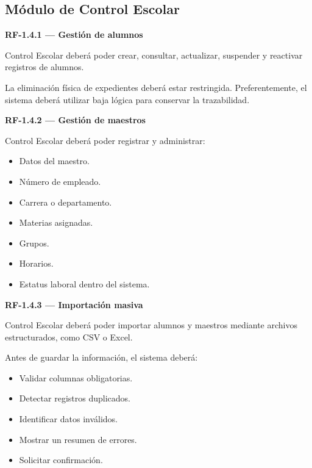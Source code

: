 \documentclass[12pt,a4paper]{article}
\newcommand{\RF}[1]{\textbf{\color{primary}RF-#1}}
\newenvironment{requisito}[1]
{
\begin{center}
\begin{minipage}{0.96\textwidth}
\colorbox{requirement}{
\begin{minipage}{0.94\textwidth}
\textbf{#1}
\end{minipage}
}
\vspace{2mm}
}
{
\end{minipage}
\end{center}
}
\begin{document}
\subsection{Módulo de Control Escolar}

\begin{requisito}{\RF{1.4.1} --- Gestión de alumnos}
Control Escolar deberá poder crear, consultar, actualizar, suspender y reactivar
registros de alumnos.

La eliminación física de expedientes deberá estar restringida. Preferentemente,
el sistema deberá utilizar baja lógica para conservar la trazabilidad.
\end{requisito}

\begin{requisito}{\RF{1.4.2} --- Gestión de maestros}
Control Escolar deberá poder registrar y administrar:

\begin{itemize}[leftmargin=*]
\item Datos del maestro.
\item Número de empleado.
\item Carrera o departamento.
\item Materias asignadas.
\item Grupos.
\item Horarios.
\item Estatus laboral dentro del sistema.
\end{itemize}
\end{requisito}

\begin{requisito}{\RF{1.4.3} --- Importación masiva}
Control Escolar deberá poder importar alumnos y maestros mediante archivos
estructurados, como CSV o Excel.

Antes de guardar la información, el sistema deberá:

\begin{itemize}[leftmargin=*]
\item Validar columnas obligatorias.
\item Detectar registros duplicados.
\item Identificar datos inválidos.
\item Mostrar un resumen de errores.
\item Solicitar confirmación.
\end{itemize}
\end{requisito}
\end{document}

